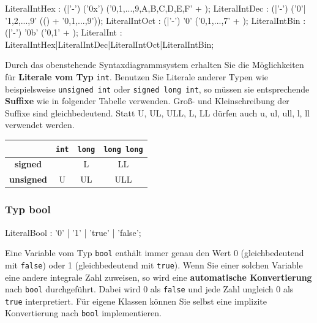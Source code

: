 \documentclass[a4paper]{report}
\begin{document}
\begin{center}
\begin{mdframed}[rightmargin=70pt, leftmargin=70pt, linewidth= 0pt]

\begin{rail}
	LiteralIntHex : (|'-') ('0x') ('0,1,...,9,A,B,C,D,E,F' +  );
	LiteralIntDec : (|'-') ('0'| '1,2,...,9' (() + '0,1,...,9'));
	LiteralIntOct : (|'-') '0' ('0,1,...,7' +  );
	LiteralIntBin : (|'-') '0b' ('0,1' +  );
	LiteralInt    : LiteralIntHex|LiteralIntDec|LiteralIntOct|LiteralIntBin;
\end{rail}
\end{mdframed}
\end{center}

Durch das obenstehende Syntaxdiagrammsystem erhalten Sie die Möglichkeiten für \textbf{Literale vom Typ} \texttt{int}. Benutzen Sie Literale anderer Typen wie beispielsweise \texttt{unsigned int} oder \texttt{signed long int}, so müssen sie entsprechende \textbf{Suffixe} wie in folgender Tabelle verwenden. Groß- und Kleinschreibung der Suffixe sind gleichbedeutend. Statt U, UL, ULL, L, LL dürfen auch u, ul, ull, l, ll verwendet werden.

\begin{center}
\begin{tabular}{|c|ccc|}
	\hline
	& 					\texttt{int} &		\texttt{long} &		\texttt{long long} \\ \hline
	\textbf{signed} &	&					L &					LL \\
	\textbf{unsigned}&	U &					UL &				ULL \\ \hline
\end{tabular}
\end{center}
\pagebreak %
\subsubsection{Typ bool}

\begin{multicols}{2}
	\begin{rail}
		LiteralBool : '0' | '1' | 'true' | 'false';
	\end{rail}

Eine Variable vom Typ \texttt{bool} enthält immer genau den Wert 0 (gleichbedeutend mit \texttt{false}) oder 1 (gleichbedeutend mit \texttt{true}). Wenn Sie einer solchen Variable eine andere integrale Zahl zuweisen, so wird eine \textbf{automatische Konvertierung} nach \texttt{bool} durchgeführt. Dabei wird 0 als \texttt{false} und jede Zahl ungleich 0 als \texttt{true} interpretiert. Für eigene Klassen können Sie selbst eine implizite Konvertierung nach \texttt{bool} implementieren.
\end{multicols}
\end{document}
